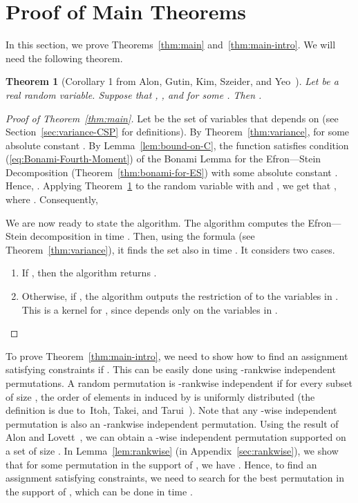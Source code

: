 \documentclass[11pt]{article}
\newtheorem{theorem}{Theorem}
\begin{document}
\section{Proof of Main Theorems}\label{sec:proof-main-thm}
In this section, we prove Theorems~\ref{thm:main} and~\ref{thm:main-intro}. We will need the following theorem.
\begin{theorem}[Corollary 1 from Alon, Gutin, Kim, Szeider, and Yeo~\cite{AGKSY}]\label{thm:AGKSY}
Let  be a real random variable. Suppose that , , and 
for some . Then .	
\end{theorem}

\begin{proof}[Proof of Theorem~\ref{thm:main}]
Let  be the set of variables that  depends on (see Section~\ref{sec:variance-CSP} for definitions).
By Theorem~\ref{thm:variance},  for some absolute constant .
By Lemma~\ref{lem:bound-on-C}, the function  satisfies condition (\ref{eq:Bonami-Fourth-Moment})
of the Bonami Lemma for the Efron---Stein Decomposition (Theorem~\ref{thm:bonami-for-ES}) with some absolute constant . Hence,
. Applying Theorem~\ref{thm:AGKSY}
to the random variable  with  and ,
we get that , where . Consequently,


We are now ready to state the algorithm. The algorithm computes the Efron---Stein decomposition in time .
Then, using the formula  (see Theorem~\ref{thm:variance}), it
finds the set  also in time . It considers two cases.
\begin{enumerate}
\item If , then the algorithm returns .
\item Otherwise, if , the algorithm outputs
the restriction of  to the variables in . This is a kernel for , since  depends only on the variables in .
\end{enumerate}
\vspace{-2mm}
\end{proof}
\vspace{-2mm}
To prove Theorem~\ref{thm:main-intro}, we need to show how to find an assignment satisfying  constraints if .
This can be easily done using -rankwise independent permutations. A random permutation  is -rankwise independent if
for every subset  of size , the order of elements in  induced by  is uniformly distributed (the definition
is due to~Itoh, Takei, and Tarui~\cite{ITT}). Note that any -wise independent permutation  is also an
-rankwise independent permutation. Using the result of Alon and Lovett~\cite{AL}, we can obtain
a -wise independent permutation  supported on a set of size . In Lemma~\ref{lem:rankwise} (in Appendix~\ref{sec:rankwise}),
we show that for some permutation  in the support of , we have .
Hence, to find an assignment satisfying  constraints, we need to search for the best permutation in the support of ,
which can be done in time .
\end{document}

